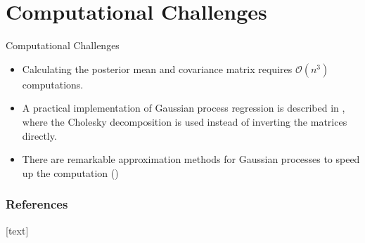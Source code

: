\documentclass[10pt]{beamer}
\begin{document}
\section{Computational Challenges}

\begin{frame}{Computational Challenges}
\begin{itemize}
\item Calculating the posterior mean and covariance matrix requires $\mathcal{O}(n^3)$ computations. 
\item A practical implementation of Gaussian process regression is described in \cite[Algorithm 2.1]{RW05}, where the Cholesky decomposition is used instead of inverting the matrices directly. 
\item There are remarkable approximation methods for Gaussian processes to speed up the computation (\cite[Chapter 20.1]{BDA13})
\end{itemize}
\end{frame}

\begin{frame}[t, allowframebreaks]
\frametitle{References}
\footnotesize{
[text]

 
}
\end{frame}
\end{document}
